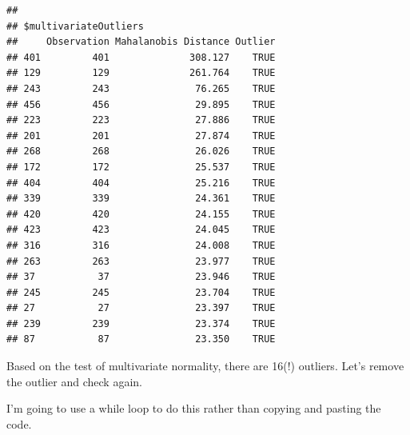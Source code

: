\documentclass{article}\usepackage[]{graphicx}\usepackage[]{color}
\makeatletter
\newenvironment{kframe}{%
 \def\at@end@of@kframe{}%
 \ifinner\ifhmode%
  \def\at@end@of@kframe{\end{minipage}}%
  \begin{minipage}{\columnwidth}%
 \fi\fi%
 \def\FrameCommand##1{\hskip\@totalleftmargin \hskip-\fboxsep
 \colorbox{shadecolor}{##1}\hskip-\fboxsep
     \hskip-\linewidth \hskip-\@totalleftmargin \hskip\columnwidth}%
 \MakeFramed {\advance\hsize-\width
   \@totalleftmargin\z@ \linewidth\hsize
   \@setminipage}}%
 {\par\unskip\endMakeFramed%
 \at@end@of@kframe}
\newenvironment{knitrout}{}{} %
\makeatother
\begin{document}
\begin{knitrout}
\begin{kframe}
\begin{verbatim}
## 
## $multivariateOutliers
##     Observation Mahalanobis Distance Outlier
## 401         401              308.127    TRUE
## 129         129              261.764    TRUE
## 243         243               76.265    TRUE
## 456         456               29.895    TRUE
## 223         223               27.886    TRUE
## 201         201               27.874    TRUE
## 268         268               26.026    TRUE
## 172         172               25.537    TRUE
## 404         404               25.216    TRUE
## 339         339               24.361    TRUE
## 420         420               24.155    TRUE
## 423         423               24.045    TRUE
## 316         316               24.008    TRUE
## 263         263               23.977    TRUE
## 37           37               23.946    TRUE
## 245         245               23.704    TRUE
## 27           27               23.397    TRUE
## 239         239               23.374    TRUE
## 87           87               23.350    TRUE
\end{verbatim}
\end{kframe}
\end{knitrout}

Based on the test of multivariate normality, there are 16(!) outliers. Let's remove the outlier and check again.

I'm going to use a while loop to do this rather than copying and pasting the code. 
\end{document}
